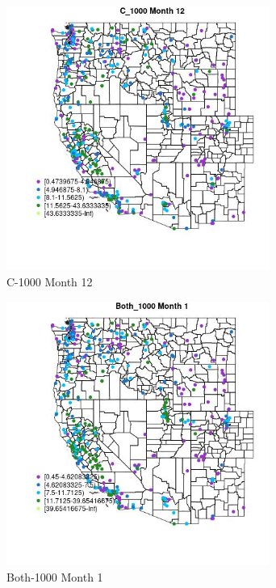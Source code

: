 \begin{figure} 
\centering  
\includegraphics[width=0.77\textwidth]{Code_Outputs/ML_input_report_ML_input_PM25_Step5_part_d_de_duplicated_aves_ML_input_MapObsMo12C_1000.jpg} 
\caption{\label{fig:ML_input_report_ML_input_PM25_Step5_part_d_de_duplicated_aves_ML_inputMapObsMo12C_1000}C-1000 Month 12} 
\end{figure} 
 

\begin{figure} 
\centering  
\includegraphics[width=0.77\textwidth]{Code_Outputs/ML_input_report_ML_input_PM25_Step5_part_d_de_duplicated_aves_ML_input_MapObsMo1Both_1000.jpg} 
\caption{\label{fig:ML_input_report_ML_input_PM25_Step5_part_d_de_duplicated_aves_ML_inputMapObsMo1Both_1000}Both-1000 Month 1} 
\end{figure} 
 

